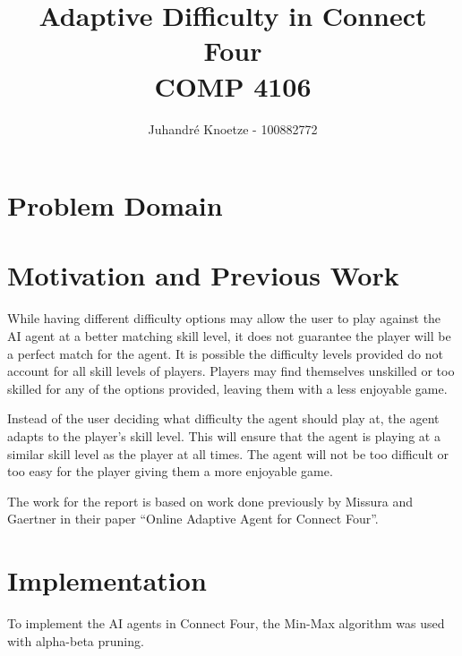 \documentclass[12pt]{article}
\title{
    \vfill
    Adaptive Difficulty in Connect Four \\
    COMP 4106
}
\author{
    Juhandr\'{e} Knoetze - 100882772
}
\begin{document}
\begin{titlepage}
    \maketitle
    \vfill
    \thispagestyle{empty}
\end{titlepage}






\section*{Problem Domain}



\section*{Motivation and Previous Work}
While having different difficulty options may allow the user to play against the AI agent at a better matching skill level, it does not guarantee the player will be a perfect match for the agent. It is possible the difficulty levels provided do not account for all skill levels of players. Players may find themselves unskilled or too skilled for any of the options provided, leaving them with a less enjoyable game.

Instead of the user deciding what difficulty the agent should play at, the agent adapts to the player's skill level. This will ensure that the agent is playing at a similar skill level as the player at all times. The agent will not be too difficult or too easy for the player giving them a more enjoyable game.

The work for the report is based on work done previously by Missura and Gaertner in their paper ``Online Adaptive Agent for Connect Four''.

\section*{Implementation}
To implement the AI agents in Connect Four, the Min-Max algorithm was used with alpha-beta pruning.
\end{document}
